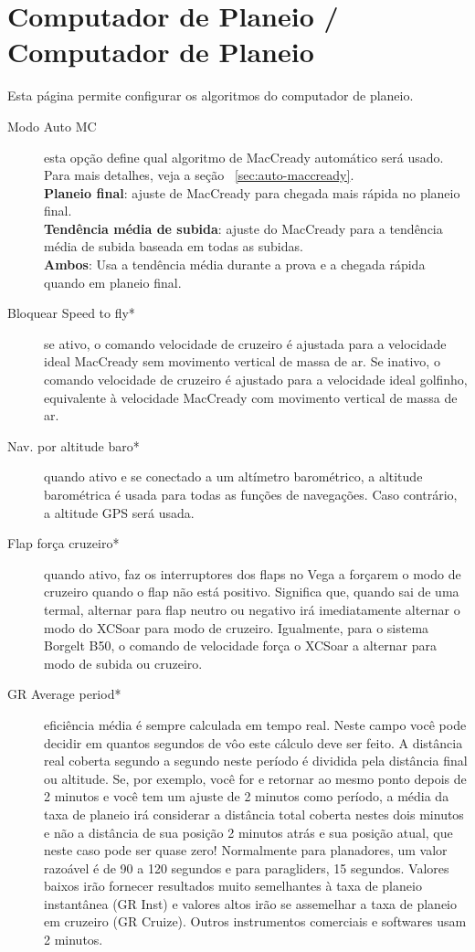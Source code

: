 \section{Computador de Planeio / Computador de Planeio}\label{sec:final-glide}\label{conf:final-glide}	

Esta página permite configurar os algoritmos do computador de planeio.

\begin{description}
\item[Modo Auto MC]  esta opção define qual algoritmo de MacCready automático será usado. Para mais detalhes, veja a seção ~\ref{sec:auto-maccready}. \\
  {\bf Planeio final}: ajuste de MacCready para chegada mais rápida no planeio final.
 \\
  {\bf Tendência média de subida}: ajuste do MacCready para a tendência média de subida baseada em todas as subidas. \\
  {\bf Ambos}: Usa a tendência média durante a prova e a chegada rápida quando em planeio final.
\item[Bloquear Speed to fly*]  se ativo, o comando velocidade de cruzeiro é ajustada para a velocidade ideal MacCready sem movimento vertical de massa de ar.  Se inativo, o comando velocidade de cruzeiro é ajustado para a velocidade ideal golfinho, equivalente à velocidade MacCready com movimento vertical de massa de ar.
\item[Nav. por altitude baro*]  quando ativo e se conectado a um altímetro barométrico, a altitude barométrica é usada para todas as funções de navegações.  Caso contrário, a altitude GPS será usada.
\item[Flap força cruzeiro*]
 quando ativo, faz os interruptores dos flaps no Vega a forçarem o modo de cruzeiro quando o flap não está positivo. Significa que, quando sai de uma termal, alternar para flap neutro ou negativo irá imediatamente alternar o modo do XCSoar para modo de cruzeiro.  Igualmente, para o sistema Borgelt B50, o comando de velocidade força o XCSoar a alternar para modo de subida ou cruzeiro.
\item[GR Average period*]  eficiência média é sempre calculada em tempo real.  Neste campo você pode decidir em quantos segundos de vôo este cálculo deve ser feito.  A distância real coberta segundo a segundo neste período é dividida pela distância final ou altitude.  Se, por exemplo, você for e retornar ao mesmo ponto depois de 2 minutos e você tem um ajuste de 2 minutos como período, a média da taxa de planeio irá considerar a distância total coberta nestes dois minutos e não a distância de sua posição 2 minutos atrás e sua posição atual, que neste caso pode ser quase zero!  Normalmente para planadores, um valor razoável é de 90 a 120 segundos e para paragliders, 15 segundos.  Valores baixos irão fornecer resultados muito semelhantes à taxa de planeio instantânea (GR Inst) e valores altos irão se assemelhar a taxa de planeio em cruzeiro (GR Cruize).  Outros instrumentos comerciais e softwares usam 2 minutos.

\end{description}
